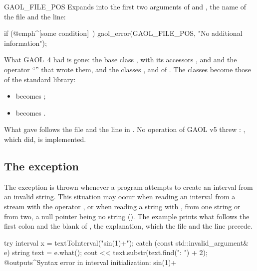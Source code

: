 \documentclass[12pt,a4paper,twoside,openright]{book}
\begin{document}
\begin{defmacro}{GAOL\_FILE\_POS}
Expands into the first two arguments of  and
, the name of the file and the line:

\begin{example}
if (@emph^[some condition]~) {
  gaol_error(GAOL_FILE_POS, "No additional information");
}
\end{example}
\end{defmacro}

\begin{Rem}
What GAOL~4 had is gone: the base class , with its
accessors ,  and  and the
operator ``\code{<{}<}'' that wrote them, and the classes
,  and
 of . The
classes become those of the standard library:
\begin{itemize}
\item {} becomes
  ;
\item {} becomes
  .
\end{itemize}
\noindent
What  gave follows the file and the line in
. No operation of GAOL v5 threw
: , which did, is
implemented.\newinvfive
\end{Rem}

\subsection{The  exception}%
\label{sec:invalid_argument}

The exception  is thrown whenever a program
attempts to create an interval from an invalid string. This situation may
occur when reading an interval from a stream with the operator \code{>{}>},
or when reading a string with , from one string
or from two, a null pointer being no string ().
The example prints what follows the first colon and the blank of
, the explanation, which the file and the line precede.

\begin{example}
try {
  interval x = textToInterval("sin(1)+");
} catch (const std::invalid_argument& e) {
  string text = e.what();
  cout << text.substr(text.find(": ") + 2);
}
@outputs^Syntax error in interval initialization: sin(1)+~
\end{example}
\end{document}
